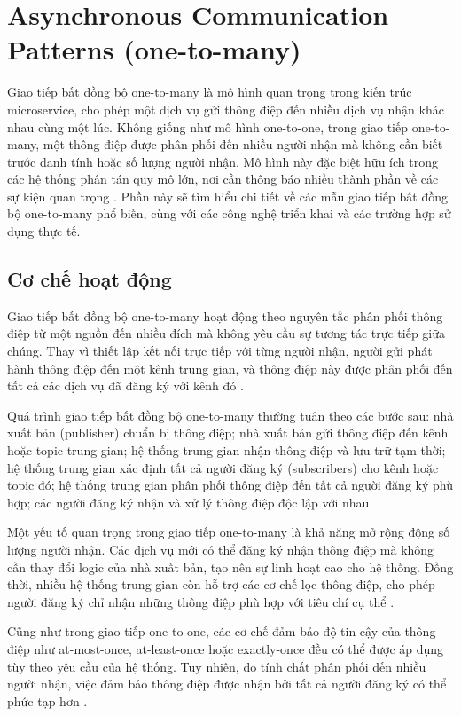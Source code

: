 \section{Asynchronous Communication Patterns (one-to-many)}
Giao tiếp bất đồng bộ one-to-many là mô hình quan trọng trong kiến trúc microservice, cho phép một dịch vụ gửi thông điệp đến nhiều dịch vụ nhận khác nhau cùng một lúc. Không giống như mô hình one-to-one, trong giao tiếp one-to-many, một thông điệp được phân phối đến nhiều người nhận mà không cần biết trước danh tính hoặc số lượng người nhận. Mô hình này đặc biệt hữu ích trong các hệ thống phân tán quy mô lớn, nơi cần thông báo nhiều thành phần về các sự kiện quan trọng \cite{newman2015}. Phần này sẽ tìm hiểu chi tiết về các mẫu giao tiếp bất đồng bộ one-to-many phổ biến, cùng với các công nghệ triển khai và các trường hợp sử dụng thực tế.
\subsection{Cơ chế hoạt động}
Giao tiếp bất đồng bộ one-to-many hoạt động theo nguyên tắc phân phối thông điệp từ một nguồn đến nhiều đích mà không yêu cầu sự tương tác trực tiếp giữa chúng. Thay vì thiết lập kết nối trực tiếp với từng người nhận, người gửi phát hành thông điệp đến một kênh trung gian, và thông điệp này được phân phối đến tất cả các dịch vụ đã đăng ký với kênh đó \cite{hohpe2004}.

Quá trình giao tiếp bất đồng bộ one-to-many thường tuân theo các bước sau: nhà xuất bản (publisher) chuẩn bị thông điệp; nhà xuất bản gửi thông điệp đến kênh hoặc topic trung gian; hệ thống trung gian nhận thông điệp và lưu trữ tạm thời; hệ thống trung gian xác định tất cả người đăng ký (subscribers) cho kênh hoặc topic đó; hệ thống trung gian phân phối thông điệp đến tất cả người đăng ký phù hợp; các người đăng ký nhận và xử lý thông điệp độc lập với nhau.

Một yếu tố quan trọng trong giao tiếp one-to-many là khả năng mở rộng động số lượng người nhận. Các dịch vụ mới có thể đăng ký nhận thông điệp mà không cần thay đổi logic của nhà xuất bản, tạo nên sự linh hoạt cao cho hệ thống. Đồng thời, nhiều hệ thống trung gian còn hỗ trợ các cơ chế lọc thông điệp, cho phép người đăng ký chỉ nhận những thông điệp phù hợp với tiêu chí cụ thể \cite{richardson2019}.

Cũng như trong giao tiếp one-to-one, các cơ chế đảm bảo độ tin cậy của thông điệp như at-most-once, at-least-once hoặc exactly-once đều có thể được áp dụng tùy theo yêu cầu của hệ thống. Tuy nhiên, do tính chất phân phối đến nhiều người nhận, việc đảm bảo thông điệp được nhận bởi tất cả người đăng ký có thể phức tạp hơn \cite{aksakalli2021}.


